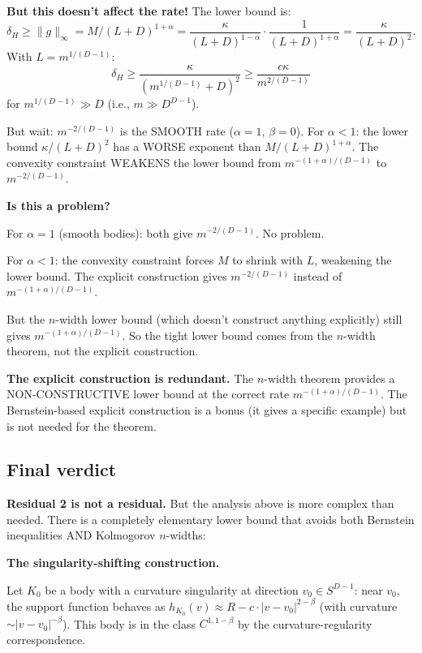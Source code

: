 \textbf{But this doesn't affect the rate!} The lower bound is:
\[
  \delta_H \geq \|g\|_\infty = M / (L+D)^{1+\alpha} = \frac{\kappa}{(L+D)^{1-\alpha}} \cdot \frac{1}{(L+D)^{1+\alpha}} = \frac{\kappa}{(L+D)^2}.
\]
With $L = m^{1/(D-1)}$:
\[
  \delta_H \geq \frac{\kappa}{(m^{1/(D-1)} + D)^2} \geq \frac{c\kappa}{m^{2/(D-1)}}
\]
for $m^{1/(D-1)} \gg D$ (i.e., $m \gg D^{D-1}$).

But wait: $m^{-2/(D-1)}$ is the SMOOTH rate ($\alpha = 1$, $\beta = 0$). For $\alpha < 1$: the lower bound $\kappa / (L+D)^2$ has a WORSE exponent than $M / (L+D)^{1+\alpha}$. The convexity constraint WEAKENS the lower bound from $m^{-(1+\alpha)/(D-1)}$ to $m^{-2/(D-1)}$.

\textbf{Is this a problem?}

For $\alpha = 1$ (smooth bodies): both give $m^{-2/(D-1)}$. No problem.

For $\alpha < 1$: the convexity constraint forces $M$ to shrink with $L$, weakening the lower bound. The explicit construction gives $m^{-2/(D-1)}$ instead of $m^{-(1+\alpha)/(D-1)}$.

But the $n$-width lower bound (which doesn't construct anything explicitly) still gives $m^{-(1+\alpha)/(D-1)}$. So the tight lower bound comes from the $n$-width theorem, not the explicit construction.

\textbf{The explicit construction is redundant.} The $n$-width theorem provides a NON-CONSTRUCTIVE lower bound at the correct rate $m^{-(1+\alpha)/(D-1)}$. The Bernstein-based explicit construction is a bonus (it gives a specific example) but is not needed for the theorem.

\subsection{Final verdict}

\textbf{Residual 2 is not a residual.} But the analysis above is more complex than needed. There is a completely elementary lower bound that avoids both Bernstein inequalities AND Kolmogorov $n$-widths:

\textbf{The singularity-shifting construction.}

Let $K_0$ be a body with a curvature singularity at direction $v_0 \in S^{D-1}$: near $v_0$, the support function behaves as $h_{K_0}(v) \approx R - c \cdot |v - v_0|^{2-\beta}$ (with curvature $\sim |v - v_0|^{-\beta}$). This body is in the class $C^{1,1-\beta}$ by the curvature-regularity correspondence.

